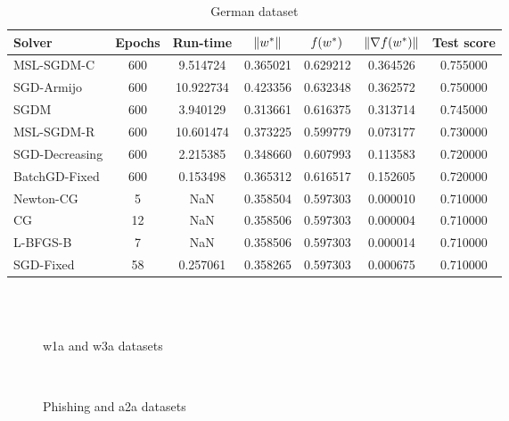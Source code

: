 \begin{table}
\caption{German dataset}
\label{tab:german-tab}
\centering
\begin{tabular}{lS[drop-zero-decimal]S[round-precision=4]S[round-precision=6]S[round-precision=6]S[exponent-mode=scientific]S[round-precision=6]}
\toprule
Solver & {Epochs} & {Run-time} & {$\lVert w^\ast\rVert$} & {$\operatorname*{\mathit{f}}(w^\ast)$} & {$\lVert\nabla f(w^\ast)\rVert$} & {Test score} \\
\midrule
MSL-SGDM-C & 600 & 9.514724 & 0.365021 & 0.629212 & 0.364526 & 0.755000 \\
SGD-Armijo & 600 & 10.922734 & 0.423356 & 0.632348 & 0.362572 & 0.750000 \\
SGDM & 600 & 3.940129 & 0.313661 & 0.616375 & 0.313714 & 0.745000 \\
MSL-SGDM-R & 600 & 10.601474 & 0.373225 & 0.599779 & 0.073177 & 0.730000 \\
SGD-Decreasing & 600 & 2.215385 & 0.348660 & 0.607993 & 0.113583 & 0.720000 \\
BatchGD-Fixed & 600 & 0.153498 & 0.365312 & 0.616517 & 0.152605 & 0.720000 \\
Newton-CG & 5 & NaN & 0.358504 & 0.597303 & 0.000010 & 0.710000 \\
CG & 12 & NaN & 0.358506 & 0.597303 & 0.000004 & 0.710000 \\
L-BFGS-B & 7 & NaN & 0.358506 & 0.597303 & 0.000014 & 0.710000 \\
SGD-Fixed & 58 & 0.257061 & 0.358265 & 0.597303 & 0.000675 & 0.710000 \\
\bottomrule
\end{tabular}
\end{table}

\begin{figure}
\centering
 \\
 \\
\caption[]{w1a and w3a datasets}
\label{fig:w1a-w3a}
\end{figure}

\begin{figure}
\centering
 \\
\caption[]{Phishing and a2a datasets}
\label{fig:phish-a2a}
\end{figure}

